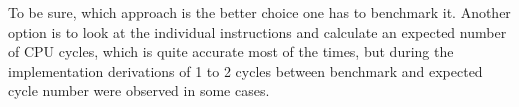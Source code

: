 To be sure, which approach is the better choice one has to benchmark it.
Another option is to look at the individual instructions and calculate an expected number of CPU cycles, which is quite accurate most of the times, but during the implementation derivations of 1 to 2 cycles between benchmark and expected cycle number were observed in some cases.
